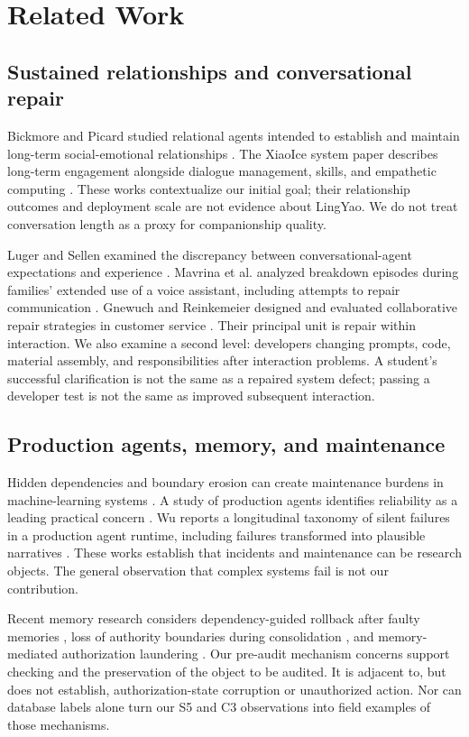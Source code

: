 \documentclass[11pt,a4paper]{article}
\begin{document}
\section{Related Work}
\subsection{Sustained relationships and conversational repair}
Bickmore and Picard studied relational agents intended to establish and maintain long-term social-emotional relationships \cite{bickmore}. The XiaoIce system paper describes long-term engagement alongside dialogue management, skills, and empathetic computing \cite{xiaoice}. These works contextualize our initial goal; their relationship outcomes and deployment scale are not evidence about LingYao. We do not treat conversation length as a proxy for companionship quality.

Luger and Sellen examined the discrepancy between conversational-agent expectations and experience \cite{luger}. Mavrina et al. analyzed breakdown episodes during families' extended use of a voice assistant, including attempts to repair communication \cite{mavrina}. Gnewuch and Reinkemeier designed and evaluated collaborative repair strategies in customer service \cite{gnewuch}. Their principal unit is repair within interaction. We also examine a second level: developers changing prompts, code, material assembly, and responsibilities after interaction problems. A student's successful clarification is not the same as a repaired system defect; passing a developer test is not the same as improved subsequent interaction.

\subsection{Production agents, memory, and maintenance}
Hidden dependencies and boundary erosion can create maintenance burdens in machine-learning systems \cite{sculley}. A study of production agents identifies reliability as a leading practical concern \cite{pan}. Wu reports a longitudinal taxonomy of silent failures in a production agent runtime, including failures transformed into plausible narratives \cite{wu}. These works establish that incidents and maintenance can be research objects. The general observation that complex systems fail is not our contribution.

Recent memory research considers dependency-guided rollback after faulty memories \cite{wang}, loss of authority boundaries during consolidation \cite{zhan}, and memory-mediated authorization laundering \cite{cerruti}. Our pre-audit mechanism concerns support checking and the preservation of the object to be audited. It is adjacent to, but does not establish, authorization-state corruption or unauthorized action. Nor can database labels alone turn our S5 and C3 observations into field examples of those mechanisms.
\end{document}
